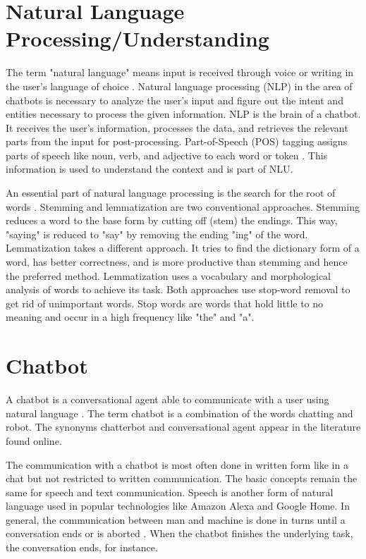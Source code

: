 \section{Natural Language Processing/Understanding}   
The term "natural language" means input is received through voice or writing in the user's language of choice \cite{buiildChatbotsPython}.
Natural language processing (NLP) in the area of chatbots is necessary to analyze the user's input and figure out the intent and entities necessary to process the given information. 
NLP is the brain of a chatbot.
It receives the user's information, processes the data, and retrieves the relevant parts from the input for post-processing.
Part-of-Speech (POS) tagging assigns parts of speech like noun, verb, and adjective to each word or token \cite{buiildChatbotsPython}.
This information is used to understand the context and is part of NLU.

An essential part of natural language processing is the search for the root of words \cite{buiildChatbotsPython}. 
Stemming and lemmatization are two conventional approaches.
Stemming reduces a word to the base form by cutting off (stem) the endings. 
This way, "saying" is reduced to "say" by removing the ending "ing" of the word.
Lemmatization takes a different approach. 
It tries to find the dictionary form of a word, has better correctness, and is more productive than stemming and hence the preferred method. 
Lemmatization uses a vocabulary and morphological analysis of words to achieve its task.
Both approaches use stop-word removal to get rid of unimportant words.
Stop words are words that hold little to no meaning and occur in a high frequency like "the" and "a".
\section{Chatbot} \label{sec:chatbot}
A chatbot is a conversational agent able to communicate with a user using natural language 
\cite{evaluateChatbotsShawar2007, shawar2007chatbots, huang2007extracting, gregori2017evaluation}.
The term chatbot is a combination of the words chatting and robot.
The synonyms chatterbot and conversational agent appear in the literature found online.

The communication with a chatbot is most often done in written form like in a chat but not restricted to written communication. 
The basic concepts remain the same for speech and text communication.
Speech is another form of natural language used in popular technologies like Amazon Alexa and Google Home.
In general, the communication between man and machine is done in turns until a conversation ends or is aborted \cite{vrajitoru2004evolutionary}.
When the chatbot finishes the underlying task, the conversation ends, for instance.

